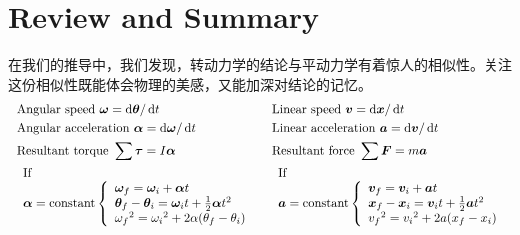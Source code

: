 \section[回顾与总结]{Review and Summary}
在我们的推导中，我们发现，转动力学的结论与平动力学有着惊人的相似性。关注这份相似性既能体会物理的美感，又能加深对结论的记忆。
\[\ \ \begin{aligned}
         & \mathrm{Angular~speed~}\vec{\omega}=\dif\vec{\theta}/\dif t                                                                                                          &   & \mathrm{Linear~speed~}\vec{v}=\dif \vec{x}/\dif t         \\
         & \mathrm{Angular~acceleration~}\vec{\alpha}=\dif\vec{\omega}/\dif t                                                                                                   &   & \mathrm{Linear~acceleration~}\vec{a}=\dif \vec{v}/\dif t  \\
         & \mathrm{Resultant~torque~}\sum\vec{\tau}=I\vec{\alpha}                                                                                                               &   & \mathrm{Resultant~force~}\sum \vec{F}=m\vec{a}            \\
         & \begin{array}{l}{{\mathrm{If}}}\\{\vec{\alpha}=\mathrm{constant}}\left\{\begin{array}{l}{{\vec{\omega}_{f}=\vec{\omega}_{i}+\vec{\alpha} t}}\\{{\vec{\theta}_{f}-\vec{\theta}_{i}=\vec{\omega}_{i}t+\frac{1}{2}\vec{\alpha} t^{2}}}\\{{\omega_{f}{}^{2}=\omega_{i}{}^{2}+2\alpha(\theta_{f}-\theta_{i})}}\end{array}\right.\end{array}
         &                                                                                                                                                                      &
        \begin{array}{l}{{\mathrm{If}}}\\{\vec{a}=\mathrm{constant}}\left\{\begin{array}{l}{{\vec{v}_{f}=\vec{v}_{i}+\vec{a}t}}\\{{\vec{x}_{f}-\vec{x}_{i}=\vec{v}_{i}t+\frac{1}{2}\vec{a}t^{2}}}\\{{v_{f}{}^{2}=v_{i}{}^{2}+2a(x_{f}-x_{i})}}\end{array}\right.\end{array}                                                                         \\

\end{aligned}\]
